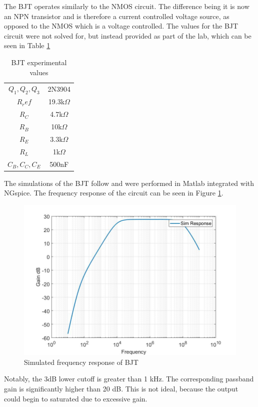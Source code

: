 
The BJT operates similarly to the NMOS circuit. The difference being it is now an NPN transistor and is therefore a current controlled voltage source, as opposed to the NMOS which is a voltage controlled. The values for the BJT circuit were not solved for, but instead provided as part of the lab, which can be seen in Table \ref{tab:bjttab}

\begin{table}[H]
	\centering
	\caption{BJT experimental values}
	\label{tab:bjttab}
	\begin{tabular}{cc}
		$Q_1, Q_2, Q_3$ & 2N3904        \\
		$R_ref$         & 19.3k$\Omega$ \\
		$R_C$           & 4.7k$\Omega$  \\
		$R_B$           & 10k$\Omega$   \\
		$R_E$           & 3.3k$\Omega$  \\
		$R_L$           & 1k$\Omega$    \\
		$C_B, C_C, C_E$ & 500nF        
	\end{tabular}
\end{table}

 The simulations of the BJT follow and were performed in Matlab integrated with NGspice. The frequency response of the circuit can be seen in Figure \ref{fig:bjtsimfreq}. 

\begin{figure}[H]
	\centering
	\includegraphics[width=.55\textwidth]{CircuitDevelopment/BJT_bandwidth.jpg}
	\caption{Simulated frequency response of BJT}
	\label{fig:bjtsimfreq}
\end{figure}

Notably, the 3dB lower cutoff is greater than 1 kHz. The corresponding passband gain is significantly higher than 20 dB. This is not ideal, because the output could begin to saturated due to excessive gain.



 



